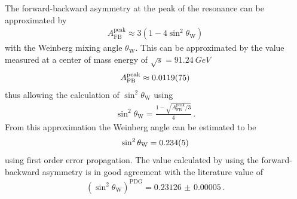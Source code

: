 \documentclass[11pt, a4paper]{article}
\numberwithin{equation}{section}
\begin{document}
The forward-backward asymmetry at the peak of the resonance can be approximated by \cite{instructions}
\begin{align*}
	A_\mathrm{FB}^\mathrm{peak} \approx 3 \left( 1 - 4 \sin^2\theta_\mathrm{W} \right)
\end{align*}
with the Weinberg mixing angle $\theta_\mathrm{W}$.
This can be approximated by the value measured at a center of mass energy of $\sqrt{s} = \SI{91.24}{GeV}$
\begin{align*}
	A_\mathrm{FB}^\mathrm{peak} \approx \num{0.0119 +- 0.0075}
\end{align*}
thus allowing the calculation of $\sin^2\theta_\mathrm{W}$ using
\begin{align*}
	\sin^2\theta_\mathrm{W} = \frac{1 - \sqrt{A_\mathrm{FB}^\mathrm{peak} / 3}}{4} \,\text{.}
\end{align*}
From this approximation the Weinberg angle can be estimated to be
\begin{align*}
	\sin^2\theta_\mathrm{W} = \num{0.234 +- 0.005}
\end{align*}
using first order error propagation.
The value calculated by using the forward-backward asymmetry is in good agreement with the literature value of \cite{pdg}
\begin{align*}
	(\sin^2\theta_\mathrm{W})^\mathrm{PDG} = \num{0.23126(5)} \,\text{.}
\end{align*}
\end{document}
